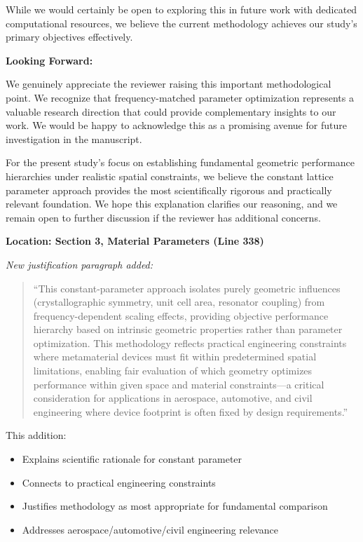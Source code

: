 \documentclass[11pt,a4paper]{article}
\newenvironment{responsebox}{%
    \par\medskip\noindent{\color{responsecolor}\rule{\linewidth}{2pt}}\par
    \noindent{\color{responsecolor}\bfseries Response}\par\smallskip
}{%
    \par\noindent{\color{responsecolor}\rule{\linewidth}{0.5pt}}\medskip
}
\newenvironment{changesbox}{%
    \par\medskip\noindent{\color{changescolor}\rule{\linewidth}{2pt}}\par
    \noindent{\color{changescolor}\bfseries Manuscript Changes}\par\smallskip
}{%
    \par\noindent{\color{changescolor}\rule{\linewidth}{0.5pt}}\medskip
}
\begin{document}
\begin{responsebox}
While we would certainly be open to exploring this in future work with dedicated computational resources, we believe the current methodology achieves our study's primary objectives effectively.

\textbf{Looking Forward:}

We genuinely appreciate the reviewer raising this important methodological point. We recognize that frequency-matched parameter optimization represents a valuable research direction that could provide complementary insights to our work. We would be happy to acknowledge this as a promising avenue for future investigation in the manuscript.

For the present study's focus on establishing fundamental geometric performance hierarchies under realistic spatial constraints, we believe the constant lattice parameter approach provides the most scientifically rigorous and practically relevant foundation. We hope this explanation clarifies our reasoning, and we remain open to further discussion if the reviewer has additional concerns.
\end{responsebox}

\begin{changesbox}
\textbf{Location: Section 3, Material Parameters (Line 338)}

\textit{New justification paragraph added:}
\begin{quote}
\textcolor{redtext}{``This constant-parameter approach isolates purely geometric influences (crystallographic symmetry, unit cell area, resonator coupling) from frequency-dependent scaling effects, providing objective performance hierarchy based on intrinsic geometric properties rather than parameter optimization. This methodology reflects practical engineering constraints where metamaterial devices must fit within predetermined spatial limitations, enabling fair evaluation of which geometry optimizes performance within given space and material constraints—a critical consideration for applications in aerospace, automotive, and civil engineering where device footprint is often fixed by design requirements.''}
\end{quote}

This addition:
\begin{itemize}
    \item Explains scientific rationale for constant parameter
    \item Connects to practical engineering constraints
    \item Justifies methodology as most appropriate for fundamental comparison
    \item Addresses aerospace/automotive/civil engineering relevance
\end{itemize}
\end{changesbox}
\end{document}
